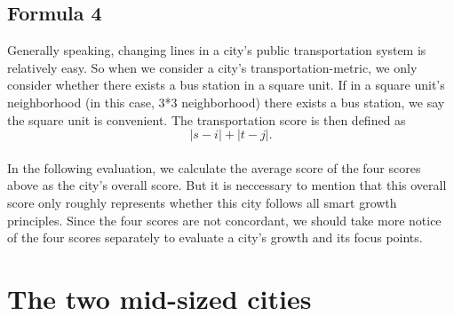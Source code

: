 \subsection{Formula 4}
Generally speaking, changing lines in a city's public transportation system is relatively easy.
So when we consider a city's transportation-metric, we only consider whether there exists a bus station in a square unit.
If in a square unit's neighborhood (in this case, 3*3 neighborhood) there exists a bus station, we say the square unit is convenient.
The transportation score is then defined as $$ |s-i| + |t-j|. $$
\\
In the following evaluation, we calculate the average score of the four scores above as the city's overall score.
But it is neccessary to mention that this overall score only roughly represents whether this city follows all smart growth principles.
Since the four scores are not concordant, we should take more notice of the four scores separately to evaluate a city's growth and its focus points.
\\


\section{The two mid-sized cities}
